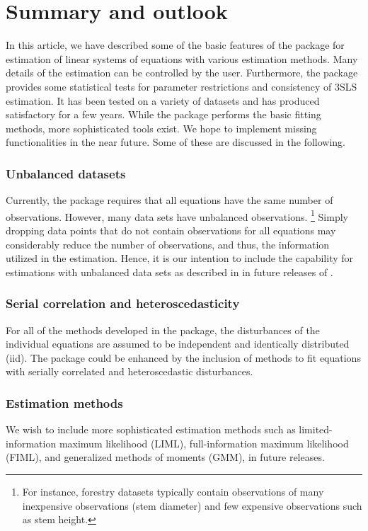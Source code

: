 

\section{Summary and outlook}\label{sec:Summmary}

In this article, we have described some of the basic features of the
 package for estimation of linear systems of
equations with various estimation methods.
Many details of the estimation can be controlled by the user.
Furthermore, the package provides some statistical tests
for parameter restrictions and consistency of 3SLS estimation.
It has been tested on a variety of datasets and has produced satisfactory
for a few years.
While the  package performs the basic fitting methods,
more sophisticated tools exist.
We hope to implement missing functionalities
in the near future.
Some of these are discussed in the following.

\subsubsection*{Unbalanced datasets}
Currently, the  package requires
that all equations have the same number of observations.
However, many data sets have unbalanced observations.%
\footnote{
For instance,
forestry datasets typically contain observations of many inexpensive
observations (stem diameter) and few expensive observations such
as stem height.
}
Simply dropping data points
that do not contain observations for all equations
may considerably reduce the number of observations,
and thus, the information utilized in the estimation.
Hence, it is our intention to include the capability for estimations
with unbalanced data sets as described in \citet{schmidt77}
in future releases of .

\subsubsection*{Serial correlation and heteroscedasticity}
For all of the methods developed in the package, the disturbances of
the individual equations are assumed to be independent and identically
distributed (iid).
The package could be enhanced by the inclusion of methods to fit
equations with serially correlated and heteroscedastic disturbances.

\subsubsection*{Estimation methods}
We wish to include more sophisticated estimation methods such
as limited-information maximum likelihood (LIML),
full-information maximum likelihood (FIML),
and generalized methods of moments (GMM), in future releases.

